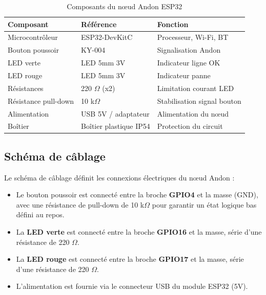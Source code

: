 \begin{table}[htbp]
\centering
\renewcommand{\arraystretch}{1.3}
\begin{tabular}{l l l}
\toprule
\textbf{Composant} & \textbf{R\'ef\'erence} & \textbf{Fonction} \\
\midrule
Microcontr\^oleur & ESP32-DevKitC & Processeur, Wi-Fi, BT \\
Bouton poussoir & KY-004 & Signalisation Andon \\
LED verte & LED 5mm 3V & Indicateur ligne OK \\
LED rouge & LED 5mm 3V & Indicateur panne \\
R\'esistances & 220 $\Omega$ (x2) & Limitation courant LED \\
R\'esistance pull-down & 10 k$\Omega$ & Stabilisation signal bouton \\
Alimentation & USB 5V / adaptateur & Alimentation du n\oe{}ud \\
Bo\^itier & Bo\^itier plastique IP54 & Protection du circuit \\
\bottomrule
\end{tabular}
\caption{Composants du n\oe{}ud Andon ESP32}
\label{tab:composants_esp32}
\end{table}

\subsection{Sch\'ema de câblage}

Le sch\'ema de câblage d\'efinit les connexions \'electriques du n\oe{}ud Andon :

\begin{itemize}
    \item Le bouton poussoir est connect\'e entre la broche \textbf{GPIO4} et la masse (GND), avec une r\'esistance de pull-down de 10 k$\Omega$ pour garantir un \'etat logique bas d\'efini au repos.
    \item La \textbf{LED verte} est connect\'e entre la broche \textbf{GPIO16} et la masse, s\'erie d'une r\'esistance de 220 $\Omega$.
    \item La \textbf{LED rouge} est connect\'e entre la broche \textbf{GPIO17} et la masse, s\'erie d'une r\'esistance de 220 $\Omega$.
    \item L'alimentation est fournie via le connecteur USB du module ESP32 (5V).
\end{itemize}


